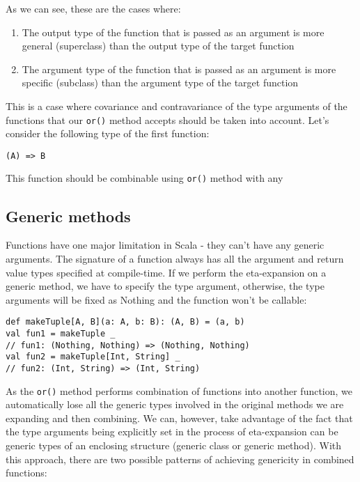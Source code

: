 
As we can see, these are the cases where:

\begin{enumerate}
	\item The output type of the function that is passed as an argument is more general (superclass) than the output type of the target function
	\item The argument type of the function that is passed as an argument is more specific (subclass) than the argument type of the target function
\end{enumerate}

This is a case where covariance and contravariance of the type arguments of the functions that our \lstinline|or()| method accepts should be taken into account. Let's consider the following type of the first function:

\lstset{style=Scala}
\begin{lstlisting}
(A) => B
\end{lstlisting}

This function should be combinable using \lstinline|or()| method with any 

\subsection{Generic methods}



Functions have one major limitation in Scala - they can't have any generic arguments. The signature of a function always has all the argument and return value types specified at compile-time. If we perform the eta-expansion on a generic method, we have to specify the type argument, otherwise, the type arguments will be fixed as Nothing and the function won't be callable:

\lstset{style=Scala}
\begin{lstlisting}
def makeTuple[A, B](a: A, b: B): (A, B) = (a, b)
val fun1 = makeTuple _
// fun1: (Nothing, Nothing) => (Nothing, Nothing)
val fun2 = makeTuple[Int, String] _
// fun2: (Int, String) => (Int, String)
\end{lstlisting}

As the \lstinline|or()| method performs combination of functions into another function, we automatically lose all the generic types involved in the original methods we are expanding and then combining. We can, however, take advantage of the fact that the type arguments being explicitly set in the process of eta-expansion can be generic types of an enclosing structure (generic class or generic method). With this approach, there are two possible patterns of achieving genericity in combined functions:

